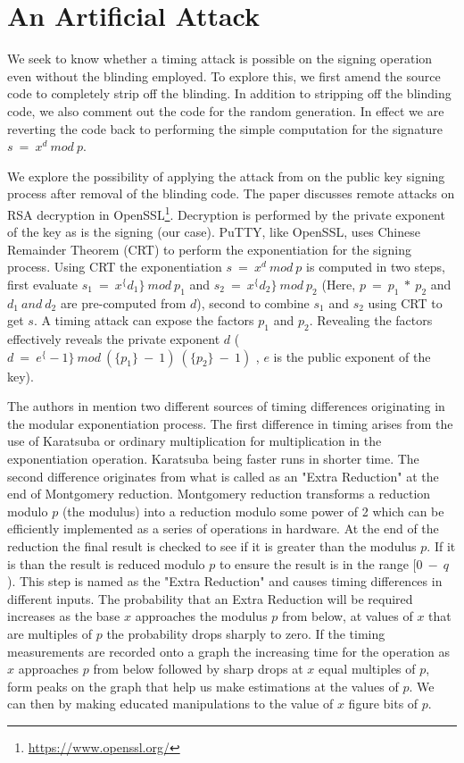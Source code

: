 \documentclass{report}
\begin{document}
\section{An Artificial Attack}
We seek to know whether a timing attack is possible on the signing operation even without the blinding employed. To explore this, we first amend the source code to completely strip off the blinding. In addition to stripping off the blinding code, we also comment out the code for the random generation. In effect we are reverting the code back to performing the simple computation for the signature \(s\ =\ x^d\ mod\ p\).\par
We explore the possibility of applying the attack from \cite{brumley} on the public key signing process after removal of the blinding code. The paper discusses remote attacks on RSA decryption in OpenSSL\footnote{\url{https://www.openssl.org/}}. Decryption is performed by the private exponent of the key as is the signing (our case). PuTTY, like OpenSSL, uses Chinese Remainder Theorem (CRT) to perform the exponentiation for the signing process. Using CRT the exponentiation \(s\ =\ x^d\ mod\ p\) is computed in two steps, first evaluate \(s_1\ =\ x^\{d_1\} \ mod\ p_1\) and \(s_2\ =\ x^\{d_2\} \ mod\ p_2\) (Here, \(p\ =\ p_1\ *\ p_2\) and \(d_1\ and\ d_2\) are pre-computed from \(d\)), second to combine \(s_1\) and \(s_2\) using CRT to get \(s\). A timing attack can expose the factors \(p_1\) and \(p_2\). Revealing the factors effectively reveals the private exponent \(d\) (\(d\ =\ e^\{-1\}\ mod\ (\{p_1\}\ -\ 1 )\ (\{p_2\}\ -\ 1)\) , \(e\) is the public exponent of the key). \par
The authors in \cite{brumley} mention two different sources of timing differences originating in the modular exponentiation process. The first difference in timing arises from the use of Karatsuba or ordinary multiplication for multiplication in the exponentiation operation. Karatsuba being faster runs in shorter time. The second difference originates from what is called as an "Extra Reduction" at the end of Montgomery reduction. Montgomery reduction transforms a reduction modulo \(p\) (the modulus) into a reduction modulo some power of 2 which can be efficiently implemented as a series of operations in hardware. At the end of the reduction the final result is checked to see if it is greater than the modulus \(p\). If it is than the result is reduced modulo \(p\) to ensure the result is in the range [\(0\ -\ q\)). This step is named as the "Extra Reduction" and causes timing differences in different inputs. The probability that an Extra Reduction will be required increases as the base \(x\) approaches the modulus \(p\) from below, at values of \(x\) that are multiples of \(p\) the probability drops sharply to zero. If the timing measurements are recorded onto a graph the increasing time for the operation  as \(x\) approaches \(p\) from below followed by sharp drops at \(x\) equal multiples of \(p\), form peaks on the graph that help us make estimations at the values of \(p\). We can then by making educated manipulations to the value of \(x\) figure bits of \(p\).
\end{document}
